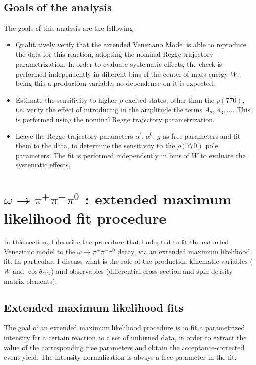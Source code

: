 \documentclass[a4paper,10pt]{report}
\newcommand{\decay}{$\omega \rightarrow \pi^+ \pi^- \pi^0$ }
\begin{document}
\section{Goals of the analysis}
The goals of this analysis are the following:
\begin{itemize}
\item Qualitatively verify that the extended Veneziano Model is able to reproduce the data for this reaction, adopting the nominal Regge trajectory parametrization. In order to evaluate systematic effects, the check is performed independently in different bins of the center-of-mass energy $W$: being this a production variable, no dependence on it is expected.
\item Estimate the sensitivity to higher $\rho$ excited states, other than the $\rho(770)$, i.e. verify the effect of introducing in the amplitude the terms $A_{2}, A_{3},\ldots$. This is performed using the nominal Regge trajectory parametrization.
\item Leave the Regge trajectory parameters $\alpha^{\prime},\, \alpha^{0},\,g $ as free parameters and fit them to the data, to determine the sensitivity to the $\rho(770)$ pole parameters. The fit is performed independently in bins of $W$ to evaluate the systematic effects.
\end{itemize}


\chapter{\decay : extended maximum likelihood fit procedure}\label{sec:fitprocedure}

In this section, I describe the procedure that I adopted to fit the extended Veneziano model to the \decay decay, via an extended maximum likelihood fit.
In particular, I discuss what is the role of the production kinematic variables ($W$ and $\cos\theta_{CM}$) and observables (differential cross section and spin-density matrix elements).

\section{Extended maximum likelihood fits}\label{sec:likelihood}

The goal of an extended maximum likelihood procedure is to fit a parametrized intensity for a certain reaction to a set of unbinned data, in order to extract the value of the corresponding free parameters and obtain 
the acceptance-corrected event yield. The intensity normalization is always a free parameter in the fit.
\end{document}
